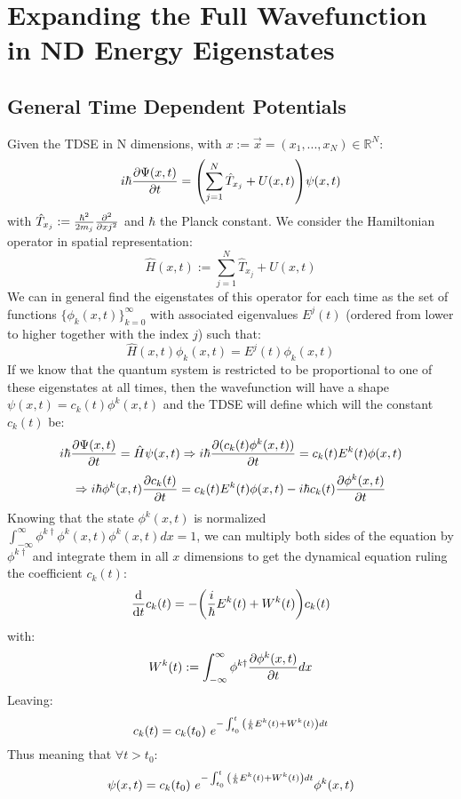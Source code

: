 \documentclass[11pt, a4paper]{article} %
\newcommand{\R}{\mathbb{R}} %
\begin{document}
\newpage
\section{Expanding the Full Wavefunction in ND Energy Eigenstates}
\subsection{General Time Dependent Potentials}
Given the TDSE in N dimensions, with $x:=\vec{x}=(x_1,...,x_N)\in \R^N$:
\begin{equation}
i\hbar \pdv{\Psi(x,t)}{t}=\qty( \sum_{j=1}^N\hat{T}_{x_j}+U(x, t) )\psi(x,t)
\end{equation}
with $\hat{T}_{x_j}:=\frac{\hbar^2}{2m_j}\pdv[2]{}{xj}$ and $\hbar$ the Planck constant. We consider the Hamiltonian operator in spatial representation:
\begin{equation}
\hat{H}(x,t):=\sum_{j=1}^N\hat{T}_{x_j}+U(x, t)
\end{equation}
We can in general find the eigenstates of this operator for each time as the set of functions $\{\phi_k(x,t)\}_{k=0}^\infty$ with associated eigenvalues $E^j(t)$ (ordered from lower to higher together with the index $j$) such that:
\begin{equation}
\hat{H}(x,t)\phi_k(x,t)=E^j(t)\phi_k(x,t)
\end{equation}
If we know that the quantum system is restricted to be proportional to one of these eigenstates at all times, then the wavefunction will have a shape $\psi(x,t)=c_k(t)\phi^k(x,t)$ and the TDSE will define which will the constant $c_k(t)$ be:
\begin{equation}
i\hbar \pdv{\Psi(x,t)}{t}=\hat{H}\psi(x,t)\Rightarrow i\hbar \pdv{(c_k(t)\phi^k(x,t))}{t}=c_k(t)E^k(t)\phi(x,t) 
\end{equation}
$$
\Rightarrow i\hbar \phi^k(x,t)\pdv{c_k(t)}{t}=c_k(t)E^k(t)\phi(x,t)-i\hbar  c_k(t)\pdv{\phi^k(x,t)}{t}
$$
Knowing that the state $\phi^k(x,t)$ is normalized $\int_{-\infty}^\infty\phi^{k \dagger}\phi^k(x,t)\phi^k(x,t)dx=1$, we can multiply both sides of the equation by $\phi^{k \dagger}$ and integrate them in all $x$ dimensions to get the dynamical equation ruling the coefficient $c_k(t)$:
\begin{equation}
\dv{}{t}c_k(t)=-\qty(\frac{i}{\hbar}E^k(t) + W^k(t) )c_k(t)
\end{equation}
with:
\begin{equation}
W^k(t):=\int_{-\infty}^\infty\phi^{k \dagger} \pdv{\phi^k(x,t)}{t} dx
\end{equation}
Leaving:
\begin{equation}
c_k(t)=c_k(t_0)\ e^{-\int_{t_0}^t \qty(\frac{i}{\hbar}E^k(t) + W^k(t) )dt}
\end{equation}
Thus meaning that $\forall t>t_0$:
$$
\psi(x,t)=c_k(t_0)\ e^{-\int_{t_0}^t \qty(\frac{i}{\hbar}E^k(t) + W^k(t) )dt} \phi^k(x,t)
$$
\end{document}
